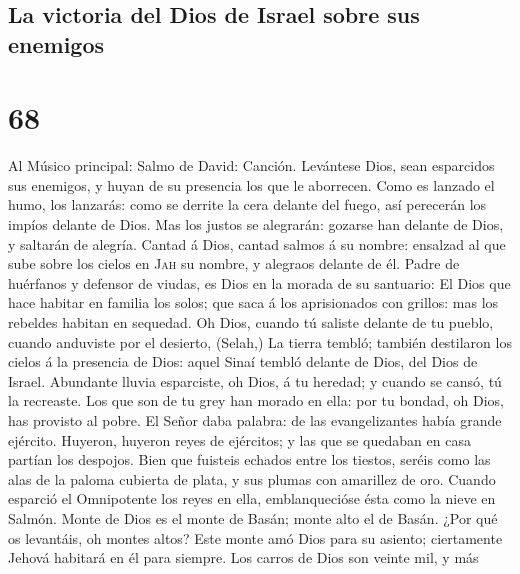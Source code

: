 \hypertarget{la-victoria-del-dios-de-israel-sobre-sus-enemigos}{%
\subsection{La victoria del Dios de Israel sobre sus
enemigos}\label{la-victoria-del-dios-de-israel-sobre-sus-enemigos}}

\hypertarget{section-67}{%
\section{68}\label{section-67}}

 Al Músico principal: Salmo de David: Canción. Levántese
Dios, sean esparcidos sus enemigos, y huyan de su presencia los que le
aborrecen.  Como es lanzado el humo, los lanzarás: como se
derrite la cera delante del fuego, así perecerán los impíos delante de
Dios.  Mas los justos se alegrarán: gozarse han delante de
Dios, y saltarán de alegría.  Cantad á Dios, cantad salmos
á su nombre: ensalzad al que sube sobre los cielos en \textsc{Jah} su
nombre, y alegraos delante de él.  Padre de huérfanos y
defensor de viudas, es Dios en la morada de su santuario: 
El Dios que hace habitar en familia los solos; que saca á los
aprisionados con grillos: mas los rebeldes habitan en sequedad.
 Oh Dios, cuando tú saliste delante de tu pueblo, cuando
anduviste por el desierto, (Selah,)  La tierra tembló;
también destilaron los cielos á la presencia de Dios: aquel Sinaí tembló
delante de Dios, del Dios de Israel.  Abundante lluvia
esparciste, oh Dios, á tu heredad; y cuando se cansó, tú la recreaste.
 Los que son de tu grey han morado en ella: por tu
bondad, oh Dios, has provisto al pobre.  El Señor daba
palabra: de las evangelizantes había grande ejército. 
Huyeron, huyeron reyes de ejércitos; y las que se quedaban en casa
partían los despojos.  Bien que fuisteis echados entre
los tiestos, seréis como las alas de la paloma cubierta de plata, y sus
plumas con amarillez de oro.  Cuando esparció el
Omnipotente los reyes en ella, emblanquecióse ésta como la nieve en
Salmón.  Monte de Dios es el monte de Basán; monte alto
el de Basán.  ¿Por qué os levantáis, oh montes altos?
Este monte amó Dios para su asiento; ciertamente Jehová habitará en él
para siempre.  Los carros de Dios son veinte mil, y más
